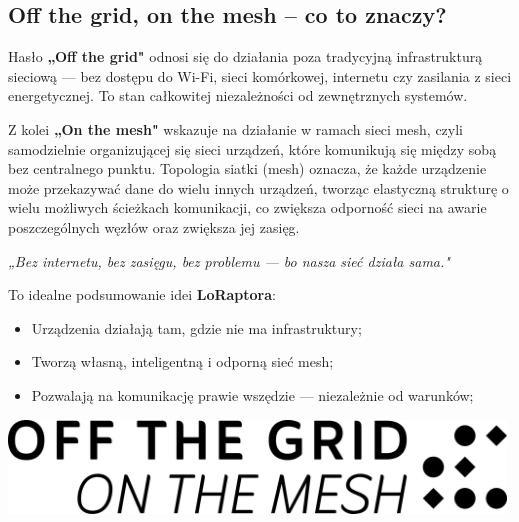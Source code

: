 \subsection{Off the grid, on the mesh – co to znaczy?}

Hasło \textbf{„Off the grid"} odnosi się do działania poza tradycyjną infrastrukturą sieciową --- bez dostępu do Wi-Fi, sieci komórkowej, internetu czy zasilania z sieci energetycznej. To stan całkowitej niezależności od zewnętrznych systemów.

Z kolei \textbf{„On the mesh"} wskazuje na działanie w ramach sieci mesh, czyli samodzielnie organizującej się sieci urządzeń, które komunikują się między sobą bez centralnego punktu. Topologia siatki (mesh) oznacza, że każde urządzenie może przekazywać dane do wielu innych urządzeń, tworząc elastyczną strukturę o wielu możliwych ścieżkach komunikacji, co zwiększa odporność sieci na awarie poszczególnych węzłów oraz zwiększa jej zasięg.

\begin{tcolorbox}[
	colback=gray!5!white, 
	colframe=gray!75!black, 
	boxrule=0.8pt, 
	arc=5pt,
	enhanced,
	drop shadow,
	top=8pt,
	bottom=8pt,
	center
]
	\begin{center}
		\emph{„Bez internetu, bez zasięgu, bez problemu --- bo nasza sieć działa sama."}
	\end{center}
\end{tcolorbox}
To idealne podsumowanie idei \textbf{LoRaptora}:
\begin{itemize}
	\item Urządzenia działają tam, gdzie nie ma infrastruktury;
	\item Tworzą własną, inteligentną i odporną sieć mesh;
	\item Pozwalają na komunikację prawie wszędzie --- niezależnie od warunków;
\end{itemize}

\vspace{1cm}
\begin{center}
\includegraphics[height=2.5cm]{root/LoRaptorHeader.png}
\end{center}
